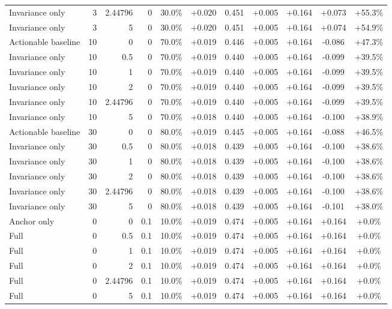 \begin{table}[htbp]
\begin{tabular}{lrrrccccccc}
Invariance only & 3 & 2.44796 & 0 & 30.0\% & +0.020 & 0.451 & +0.005 & +0.164 & +0.073 & +55.3\% \\
Invariance only & 3 & 5 & 0 & 30.0\% & +0.020 & 0.451 & +0.005 & +0.164 & +0.074 & +54.9\% \\
Actionable baseline & 10 & 0 & 0 & 70.0\% & +0.019 & 0.446 & +0.005 & +0.164 & -0.086 & +47.3\% \\
Invariance only & 10 & 0.5 & 0 & 70.0\% & +0.019 & 0.440 & +0.005 & +0.164 & -0.099 & +39.5\% \\
Invariance only & 10 & 1 & 0 & 70.0\% & +0.019 & 0.440 & +0.005 & +0.164 & -0.099 & +39.5\% \\
Invariance only & 10 & 2 & 0 & 70.0\% & +0.019 & 0.440 & +0.005 & +0.164 & -0.099 & +39.5\% \\
Invariance only & 10 & 2.44796 & 0 & 70.0\% & +0.019 & 0.440 & +0.005 & +0.164 & -0.099 & +39.5\% \\
Invariance only & 10 & 5 & 0 & 70.0\% & +0.018 & 0.440 & +0.005 & +0.164 & -0.100 & +38.9\% \\
Actionable baseline & 30 & 0 & 0 & 80.0\% & +0.019 & 0.445 & +0.005 & +0.164 & -0.088 & +46.5\% \\
Invariance only & 30 & 0.5 & 0 & 80.0\% & +0.018 & 0.439 & +0.005 & +0.164 & -0.100 & +38.6\% \\
Invariance only & 30 & 1 & 0 & 80.0\% & +0.018 & 0.439 & +0.005 & +0.164 & -0.100 & +38.6\% \\
Invariance only & 30 & 2 & 0 & 80.0\% & +0.018 & 0.439 & +0.005 & +0.164 & -0.100 & +38.6\% \\
Invariance only & 30 & 2.44796 & 0 & 80.0\% & +0.018 & 0.439 & +0.005 & +0.164 & -0.100 & +38.6\% \\
Invariance only & 30 & 5 & 0 & 80.0\% & +0.018 & 0.439 & +0.005 & +0.164 & -0.101 & +38.0\% \\
Anchor only & 0 & 0 & 0.1 & 10.0\% & +0.019 & 0.474 & +0.005 & +0.164 & +0.164 & +0.0\% \\
Full & 0 & 0.5 & 0.1 & 10.0\% & +0.019 & 0.474 & +0.005 & +0.164 & +0.164 & +0.0\% \\
Full & 0 & 1 & 0.1 & 10.0\% & +0.019 & 0.474 & +0.005 & +0.164 & +0.164 & +0.0\% \\
Full & 0 & 2 & 0.1 & 10.0\% & +0.019 & 0.474 & +0.005 & +0.164 & +0.164 & +0.0\% \\
Full & 0 & 2.44796 & 0.1 & 10.0\% & +0.019 & 0.474 & +0.005 & +0.164 & +0.164 & +0.0\% \\
Full & 0 & 5 & 0.1 & 10.0\% & +0.019 & 0.474 & +0.005 & +0.164 & +0.164 & +0.0\% \\

\end{tabular}
\end{table}
